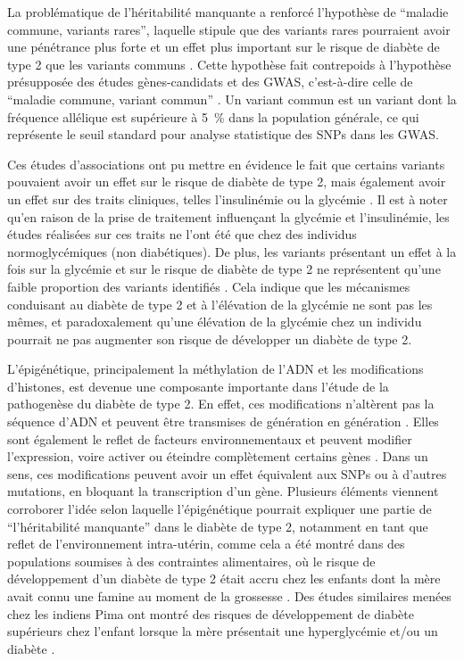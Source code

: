 \documentclass[11pt,a4paper,notrimn]{krantz}
\theoremstyle{definition}
\theoremstyle{definition}
\theoremstyle{remark}
\begin{document}
La problématique de l'héritabilité manquante a renforcé l'hypothèse de
``maladie commune, variants rares'', laquelle stipule que des variants
rares pourraient avoir une pénétrance plus forte et un effet plus
important sur le risque de diabète de type 2 que les variants communs
\citep{lupski_clan_2011, schork_common_2009}. Cette hypothèse fait
contrepoids à l'hypothèse présupposée des études gènes-candidats et des
GWAS, c'est-à-dire celle de ``maladie commune, variant commun''
\citep{schork_common_2009}. Un variant commun est un variant dont la
fréquence allélique est supérieure à 5~\% dans la population générale,
ce qui représente le seuil standard pour analyse statistique des SNPs
dans les GWAS.

Ces études d'associations ont pu mettre en évidence le fait que certains
variants pouvaient avoir un effet sur le risque de diabète de type 2,
mais également avoir un effet sur des traits cliniques, telles
l'insulinémie ou la glycémie
\citep{dupuis_new_2010, voight_twelve_2010, yaghootkar_recent_2013}. Il
est à noter qu'en raison de la prise de traitement influençant la
glycémie et l'insulinémie, les études réalisées sur ces traits ne l'ont
été que chez des individus normoglycémiques (non diabétiques). De plus,
les variants présentant un effet à la fois sur la glycémie et sur le
risque de diabète de type 2 ne représentent qu'une faible proportion des
variants identifiés
\citep{dupuis_new_2010, voight_twelve_2010, yaghootkar_recent_2013}.
Cela indique que les mécanismes conduisant au diabète de type 2 et à
l'élévation de la glycémie ne sont pas les mêmes, et paradoxalement
qu'une élévation de la glycémie chez un individu pourrait ne pas
augmenter son risque de développer un diabète de type 2.

L'épigénétique, principalement la méthylation de l'ADN et les
modifications d'histones, est devenue une composante importante dans
l'étude de la pathogenèse du diabète de type 2. En effet, ces
modifications n'altèrent pas la séquence d'ADN et peuvent être
transmises de génération en génération \citep{raciti_personalized_2014}.
Elles sont également le reflet de facteurs environnementaux et peuvent
modifier l'expression, voire activer ou éteindre complètement certains
gènes \citep{zierath_research_2011}. Dans un sens, ces modifications
peuvent avoir un effet équivalent aux SNPs ou à d'autres mutations, en
bloquant la transcription d'un gène. Plusieurs éléments viennent
corroborer l'idée selon laquelle l'épigénétique pourrait expliquer une
partie de ``l'héritabilité manquante'' dans le diabète de type 2,
notamment en tant que reflet de l'environnement intra-utérin, comme cela
a été montré dans des populations soumises à des contraintes
alimentaires, où le risque de développement d'un diabète de type 2 était
accru chez les enfants dont la mère avait connu une famine au moment de
la grossesse
\citep{hales_type_1992, pettitt_congenital_1988, ravelli_glucose_1998}.
Des études similaires menées chez les indiens Pima ont montré des
risques de développement de diabète supérieurs chez l'enfant lorsque la
mère présentait une hyperglycémie et/ou un diabète
\citep{dabelea_intrauterine_2000, pavkov_effect_2010, pettitt_excessive_1983}.
\end{document}
